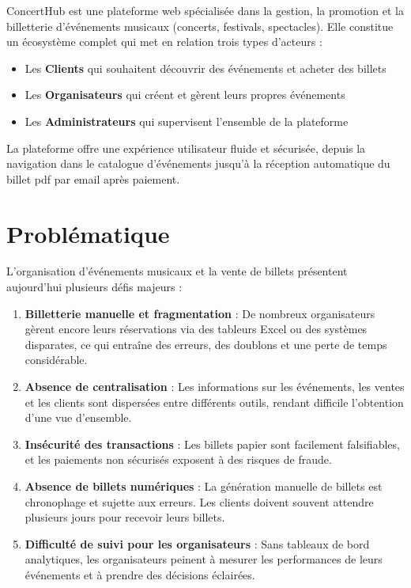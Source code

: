 \documentclass[a4paper,12pt,twoside]{report}
\begin{document}
ConcertHub est une plateforme web spécialisée dans la gestion, la promotion et la billetterie d'événements musicaux (concerts, festivals, spectacles). Elle constitue un écosystème complet qui met en relation trois types d'acteurs :

\begin{itemize}
    \item Les \textbf{Clients} qui souhaitent découvrir des événements et acheter des billets
    \item Les \textbf{Organisateurs} qui créent et gèrent leurs propres événements
    \item Les \textbf{Administrateurs} qui supervisent l'ensemble de la plateforme
\end{itemize}

La plateforme offre une expérience utilisateur fluide et sécurisée, depuis la navigation dans le catalogue d'événements jusqu'à la réception automatique du billet \gls{pdf} par email après paiement.

\section{Problématique}

L'organisation d'événements musicaux et la vente de billets présentent aujourd'hui plusieurs défis majeurs :

\begin{enumerate}
    \item \textbf{Billetterie manuelle et fragmentation} : De nombreux organisateurs gèrent encore leurs réservations via des tableurs Excel ou des systèmes disparates, ce qui entraîne des erreurs, des doublons et une perte de temps considérable.
    
    \item \textbf{Absence de centralisation} : Les informations sur les événements, les ventes et les clients sont dispersées entre différents outils, rendant difficile l'obtention d'une vue d'ensemble.
    
    \item \textbf{Insécurité des transactions} : Les billets papier sont facilement falsifiables, et les paiements non sécurisés exposent à des risques de fraude.
    
    \item \textbf{Absence de billets numériques} : La génération manuelle de billets est chronophage et sujette aux erreurs. Les clients doivent souvent attendre plusieurs jours pour recevoir leurs billets.
    
    \item \textbf{Difficulté de suivi pour les organisateurs} : Sans tableaux de bord analytiques, les organisateurs peinent à mesurer les performances de leurs événements et à prendre des décisions éclairées.
\end{enumerate}
\end{document}

